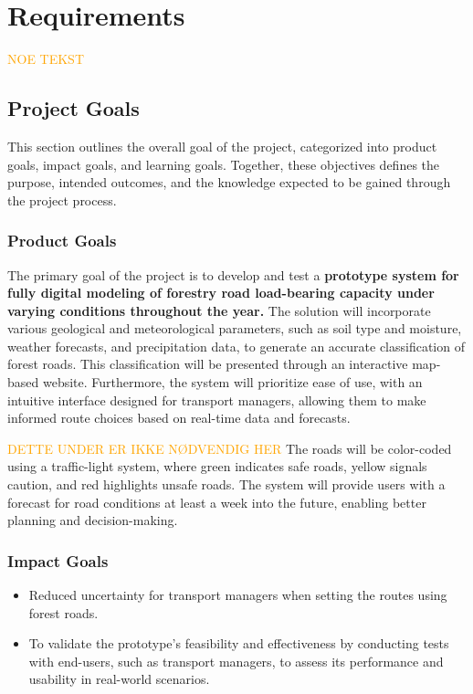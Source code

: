 \chapter{Requirements}\label{chap:requirements}

\textcolor{orange}{NOE TEKST}

\section{Project Goals}

This section outlines the overall goal of the project, categorized into product goals, impact goals, and learning goals. Together, these objectives defines the purpose, intended outcomes, and the knowledge expected to be gained through the project process.

\subsection{Product Goals}

The primary goal of the project is to develop and test a \textbf{prototype system for fully digital modeling of forestry road load-bearing capacity under varying conditions throughout the year.} The solution will incorporate various geological and meteorological parameters, such as soil type and moisture, weather forecasts, and precipitation data, to generate an accurate classification of forest roads. This classification will be presented through an interactive map-based website. Furthermore, the system will prioritize ease of use, with an intuitive interface designed for transport managers, allowing them to make informed route choices based on real-time data and forecasts. 

\textcolor{orange}{DETTE UNDER ER IKKE NØDVENDIG HER}
The roads will be color-coded using a traffic-light system, where green indicates safe roads, yellow signals caution, and red highlights unsafe roads. The system will provide users with a forecast for road conditions at least a week into the future, enabling better planning and decision-making. 

\subsection{Impact Goals}
\begin{itemize}
    \item Reduced uncertainty for transport managers when setting the routes using forest roads.
    \item To validate the prototype's feasibility and effectiveness by conducting tests with end-users, such as transport managers, to assess its performance and usability in real-world scenarios.
\end{itemize}

